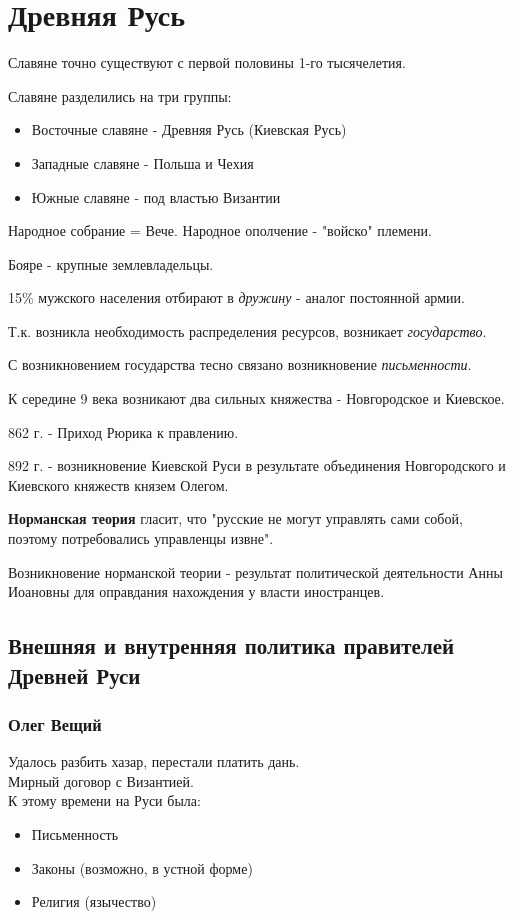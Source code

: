 
\section{Древняя Русь}

Славяне точно существуют с первой половины 1-го тысячелетия.

Славяне разделились на три группы:
\begin{itemize} 
  \item Восточные славяне - Древняя Русь (Киевская Русь)
  \item Западные славяне - Польша и Чехия
  \item Южные славяне - под властью Византии
\end{itemize}

Народное собрание = Вече.
Народное ополчение - "войско" племени.

Бояре - крупные землевладельцы.

15\% мужского населения отбирают в \textit{дружину} - аналог постоянной армии.

Т.к. возникла необходимость распределения ресурсов, возникает \textit{государство}.

С возникновением государства тесно связано возникновение \textit{письменности}.

К середине 9 века возникают два сильных княжества - Новгородское и Киевское.

862 г. - Приход Рюрика к правлению.

892 г. - возникновение Киевской Руси в результате объединения Новгородского и Киевского княжеств князем Олегом.

\textbf{Норманская теория} гласит, что "русские не могут управлять сами собой, поэтому потребовались управленцы извне".

Возникновение норманской теории - результат политической деятельности Анны Иоановны для оправдания нахождения у власти иностранцев.

\subsection{Внешняя и внутренняя политика правителей Древней Руси}

\subsubsection*{Олег Вещий}

Удалось разбить хазар, перестали платить дань. \\
Мирный договор с Византией. \\
К этому времени на Руси была:
\begin{itemize}
  \item Письменность
  \item Законы (возможно, в устной форме)
  \item Религия (язычество)
\end{itemize}

